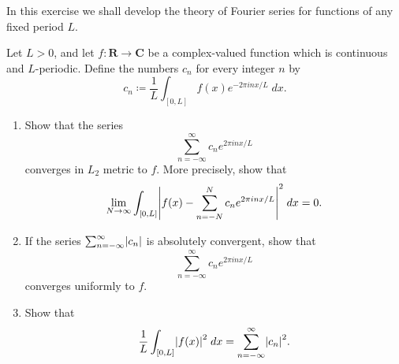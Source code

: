 \begin{exercise}\label{ex 5.5.6}
    In this exercise we shall develop the theory of Fourier series for functions of any fixed period \(L\).

    Let \(L > 0\), and let \(f : \mathbf{R} \to \mathbf{C}\) be a complex-valued function which is continuous and \(L\)-periodic.
    Define the numbers \(c_n\) for every integer \(n\) by
    \[
        c_n \coloneqq \frac{1}{L} \int_{[0, L]} f(x) e^{- 2 \pi i n x / L} \; dx.
    \]
    \begin{enumerate}
        \item Show that the series
              \[
                  \sum_{n = -\infty}^\infty c_n e^{2 \pi i n x / L}
              \]
              converges in \(L_2\) metric to \(f\).
              More precisely, show that
              \[
                  \lim_{N \to \infty} \int_{[0, L]} \abs*{f(x) - \sum_{n = -N}^N c_n e^{2 \pi i n x / L}}^2 \; dx = 0.
              \]
        \item If the series \(\sum_{n = -\infty}^\infty \abs*{c_n}\) is absolutely convergent, show that
              \[
                  \sum_{n = -\infty}^\infty c_n e^{2 \pi i n x / L}
              \]
              converges uniformly to \(f\).
        \item Show that
              \[
                  \frac{1}{L} \int_{[0, L]} \abs*{f(x)}^2 \; dx = \sum_{n = -\infty}^\infty \abs*{c_n}^2.
              \]
    \end{enumerate}
\end{exercise}